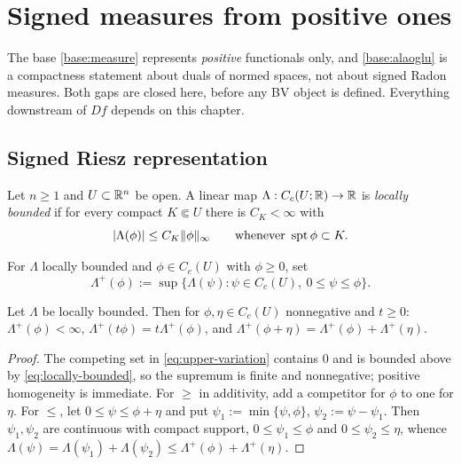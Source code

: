 \chapter{Signed measures from positive ones}\label{ch:signed}

The base \ref{base:measure} represents \emph{positive} functionals only, and
\ref{base:alaoglu} is a compactness statement about duals of normed spaces,
not about signed Radon measures.  Both gaps are closed here, before any BV
object is defined.  Everything downstream of $Df$ depends on this chapter.

\section{Signed Riesz representation}\label{sec:signed-riesz}

\begin{definition}\label{def:locally-bounded}
Let $n\ge1$ and $U\subset\mathbb R^n$ be open.  A linear map
$\Lambda:C_c(U;\mathbb R)\to\mathbb R$ is \emph{locally bounded} if for every compact
$K\Subset U$ there is $C_K<\infty$ with
\begin{equation}\label{eq:locally-bounded}
  |\Lambda(\phi)|\le C_K\|\phi\|_\infty
  \qquad\text{whenever }\operatorname{spt}\phi\subset K .
\end{equation}
\end{definition}

\begin{definition}\label{def:upper-variation}
For $\Lambda$ locally bounded and $\phi\in C_c(U)$ with $\phi\ge0$, set
\begin{equation}\label{eq:upper-variation}
  \Lambda^+(\phi):=\sup\{\Lambda(\psi):\psi\in C_c(U),\ 0\le\psi\le\phi\}.
\end{equation}
\end{definition}

\begin{lemma}
\label{lem:upper-variation-additive}
Let $\Lambda$ be locally bounded.  Then for $\phi,\eta\in C_c(U)$ nonnegative
and $t\ge0$:
$\Lambda^+(\phi)<\infty$, $\Lambda^+(t\phi)=t\Lambda^+(\phi)$, and
$\Lambda^+(\phi+\eta)=\Lambda^+(\phi)+\Lambda^+(\eta)$.
\end{lemma}

\begin{proof}
The competing set in \eqref{eq:upper-variation} contains $0$ and is bounded
above by \eqref{eq:locally-bounded}, so the supremum is finite and
nonnegative; positive homogeneity is immediate.  For
$\ge$ in additivity, add a competitor for $\phi$ to one for $\eta$.  For
$\le$, let $0\le\psi\le\phi+\eta$ and put
$\psi_1:=\min\{\psi,\phi\}$, $\psi_2:=\psi-\psi_1$.  Then $\psi_1,\psi_2$ are
continuous with compact support, $0\le\psi_1\le\phi$ and
$0\le\psi_2\le\eta$, whence
$\Lambda(\psi)=\Lambda(\psi_1)+\Lambda(\psi_2)\le\Lambda^+(\phi)+\Lambda^+(\eta)$.
\end{proof}

